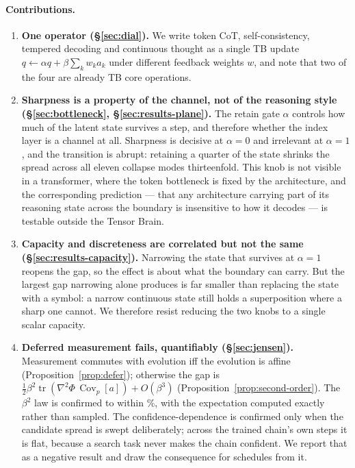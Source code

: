 \documentclass[11pt]{article}
\theoremstyle{definition}
\newcommand{\Ev}{\Phi}
\newcommand{\Cov}{\operatorname{Cov}}
\newcommand{\tr}{\operatorname{tr}}
\begin{document}
\paragraph{Contributions.}
\begin{enumerate}
\item \textbf{One operator (\S\ref{sec:dial}).} We write token CoT, self-consistency,
tempered decoding and continuous thought as a single TB update
$q \leftarrow \alpha q + \beta \sum_k w_k a_k$ under different feedback weights $w$,
and note that two of the four are already TB core operations.

\item \textbf{Sharpness is a property of the channel, not of the reasoning style
(\S\ref{sec:bottleneck}, \S\ref{sec:results-plane}).} The retain gate $\alpha$
controls how much of the latent state survives a step, and therefore whether the
index layer is a channel at all. Sharpness is decisive at $\alpha = 0$ and
irrelevant at $\alpha = 1$, and the transition is abrupt: retaining a quarter of the
state shrinks the spread across all eleven collapse modes thirteenfold. This knob is
not visible in a transformer, where the token bottleneck is fixed by the
architecture, and the corresponding prediction --- that any architecture carrying part
of its reasoning state across the boundary is insensitive to how it decodes --- is
testable outside the Tensor Brain.

\item \textbf{Capacity and discreteness are correlated but not the same
(\S\ref{sec:results-capacity}).} Narrowing the state that survives at $\alpha = 1$
reopens the gap, so the effect is about what the boundary can carry. But the largest
gap narrowing alone produces is far smaller than replacing the state with a symbol:
a narrow continuous state still holds a superposition where a sharp one cannot. We
therefore resist reducing the two knobs to a single scalar capacity.

\item \textbf{Deferred measurement fails, quantifiably (\S\ref{sec:jensen}).}
Measurement commutes with evolution iff the evolution is affine
(Proposition~\ref{prop:defer}); otherwise the gap is
$\tfrac12\beta^2\tr(\nabla^2\Ev\,\Cov_p[a]) + O(\beta^3)$
(Proposition~\ref{prop:second-order}). The $\beta^2$ law is confirmed to within
\JensenQuadraticError\%, with the expectation computed exactly rather than sampled.
The confidence-dependence is confirmed only when the candidate spread is swept
deliberately; across the trained chain's own steps it is flat, because a search task
never makes the chain confident. We report that as a negative result and draw the
consequence for schedules from it.


\end{enumerate}
\end{document}
